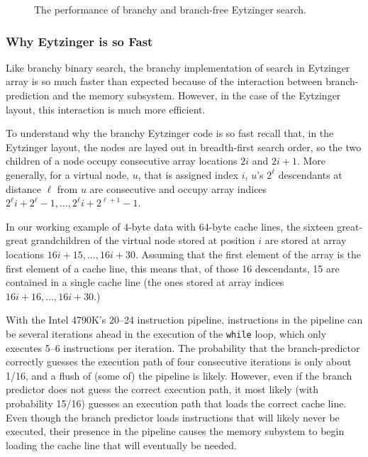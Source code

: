 \documentclass{patmorin}
\begin{document}
\begin{figure}
   \caption{The performance of branchy and branch-free Eytzinger search.}
\end{figure}

\subsubsection{Why Eytzinger is so Fast}

Like branchy binary search, the branchy implementation of search in
Eytzinger array is so much faster than expected because of the interaction
between branch-prediction and the memory subsystem.  However, in the
case of the Eytzinger layout, this interaction is much more efficient.

To understand why the branchy Eytzinger code is so fast recall that,
in the Eytzinger layout, the nodes are layed out in breadth-first
search order,  so the two children of a node occupy consecutive array
locations $2i$ and $2i+1$. More generally, for a virtual node, $u$,
that is assigned index $i$, $u$'s $2^\ell$ descendants at distance
$\ell$ from $u$ are consecutive and occupy array indices $2^\ell i +
2^{\ell}-1,\ldots,2^{\ell} i + 2^{\ell+1}-1$.

In our working example of 4-byte data with 64-byte cache lines, the
sixteen great-great grandchildren of the virtual node stored at position
$i$ are stored at array locations $16i+15,\ldots,16i+30$.  Assuming that
the first element of the array is the first element of a cache line,
this means that, of those 16 descendants, 15 are contained in a single
cache line (the ones stored at array indices $16i+16,\ldots,16i+30$.)

With the Intel 4790K's 20--24 instruction pipeline, instructions in
the pipeline can be several iterations ahead in the execution of the
\texttt{while} loop, which only executes 5--6 instructions per
iteration.  The probability that the branch-predictor correctly guesses
the execution path of four consecutive iterations is only about 1/16,
and a flush of (some of) the pipeline is likely.  However, even if the
branch predictor does not guess the correct execution path, it most likely
(with probability 15/16) guesses an execution path that loads the correct
cache line.  Even though the branch predictor loads instructions that will
likely never be executed, their presence in the pipeline causes the memory
subystem to begin loading the cache line that will eventually be needed.
\end{document}

